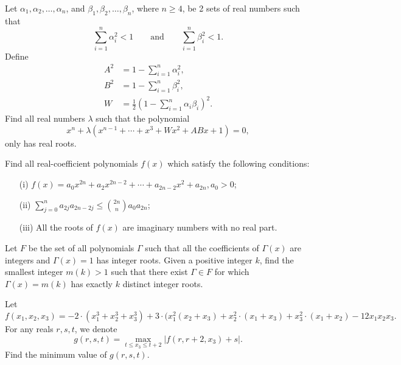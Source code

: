 \documentclass[12pt,a4paper]{memoir}
\theoremstyle{definition}
\begin{document}
\begin{question}[name={1996 China TST}]
	Let $\alpha_1, \alpha_2, \dots, \alpha_n$, and $\beta_1, \beta_2, \ldots, \beta_n$, where $n \geq 4$, be 2 sets of real numbers such that 
	\[\sum_{i=1}^{n} \alpha_i^2 < 1 \qquad \text{and} \qquad \sum_{i=1}^{n} \beta_i^2 < 1.\]
	Define
	\begin{align*}
		A^2 &= 1 - \sum_{i=1}^{n} \alpha_i^2,\\ 
		B^2 &= 1 - \sum_{i=1}^{n} \beta_i^2,\\
		W &= \frac{1}{2} (1 - \sum_{i=1}^{n} \alpha_i \beta_i)^2.
	\end{align*}
	Find all real numbers $\lambda$ such that the polynomial \[x^n + \lambda (x^{n-1} + \cdots + x^3 + Wx^2 + ABx + 1) = 0,\] only has real roots.
\end{question}




\begin{question}[name={1997 China TST}]
	Find all real-coefficient polynomials $f(x)$ which satisfy the following conditions:
	\begin{itemize}
		\item[(i)]  $f(x) = a_0 x^{2n} + a_2 x^{2n - 2} + \cdots + a_{2n - 2} x^2 + a_{2n}, a_0 > 0$;
		\item[(ii)] $\displaystyle \sum_{j=0}^n a_{2j} a_{2n - 2j} \leq \binom{2n}{n} a_0 a_{2n}$;
		\item[(iii)] All the roots of $f(x)$ are imaginary numbers with no real part.
	\end{itemize}
\end{question}




\begin{question}[name={2000 China TST}]
	Let $F$ be the set of all polynomials $\Gamma$ such that all the coefficients of $\Gamma (x)$ are integers and $\Gamma (x) = 1$ has integer roots. Given a positive integer $k$, find the smallest integer $m(k) > 1$ such that there exist $\Gamma \in F$ for which $\Gamma (x) = m(k)$ has exactly $k$ distinct integer roots.
\end{question}




\begin{question}[name={2002 China TST}]
	Let \[f(x_1,x_2,x_3) = -2 \cdot (x_1^3+x_2^3+x_3^3) + 3 \cdot (x_1^2(x_2+x_3) + x_2^2 \cdot (x_1+x_3) + x_3^2 \cdot ( x_1+x_2 ) - 12x_1x_2x_3.\] For any reals $r,s,t$, we denote \[g(r,s,t)=\max_{t\leq x_3\leq t+2} |f(r,r+2,x_3)+s|.\] Find the minimum value of $g(r,s,t)$.
\end{question}
\end{document}
